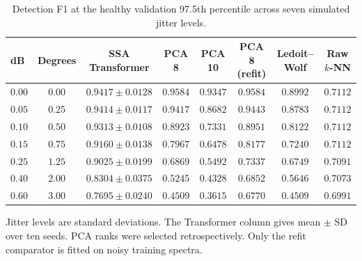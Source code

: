 \begin{table}[!ht]
\centering
\caption{Detection F1 at the healthy validation 97.5th percentile across seven simulated jitter levels.}
\label{tab:fra_noise_sweep}
\footnotesize
\setlength{\tabcolsep}{5pt}
\renewcommand{\arraystretch}{1.17}
\begin{tabular*}{\textwidth}{@{\extracolsep{\fill}}lccccccc@{}}
\toprule
dB & Degrees & SSA Transformer & PCA 8 & PCA 10 & PCA 8 (refit) & Ledoit--Wolf & Raw $k$-NN \\
\midrule
$0.00$ & $0.00$ & $0.9417 \pm 0.0128$ & $0.9584$ & $0.9347$ & $0.9584$ & $0.8992$ & $0.7112$ \\
$0.05$ & $0.25$ & $0.9414 \pm 0.0117$ & $0.9417$ & $0.8682$ & $0.9443$ & $0.8783$ & $0.7112$ \\
$0.10$ & $0.50$ & $0.9313 \pm 0.0108$ & $0.8923$ & $0.7331$ & $0.8951$ & $0.8122$ & $0.7112$ \\
$0.15$ & $0.75$ & $0.9160 \pm 0.0138$ & $0.7967$ & $0.6478$ & $0.8177$ & $0.7240$ & $0.7112$ \\
$0.25$ & $1.25$ & $0.9025 \pm 0.0199$ & $0.6869$ & $0.5492$ & $0.7337$ & $0.6749$ & $0.7091$ \\
$0.40$ & $2.00$ & $0.8304 \pm 0.0375$ & $0.5245$ & $0.4328$ & $0.6852$ & $0.5646$ & $0.7073$ \\
$0.60$ & $3.00$ & $0.7695 \pm 0.0240$ & $0.4509$ & $0.3615$ & $0.6770$ & $0.4509$ & $0.6991$ \\
\bottomrule
\end{tabular*}
\par\smallskip\parbox{\textwidth}{Jitter levels are standard deviations. The Transformer column gives mean $\pm$ SD over ten seeds. PCA ranks were selected retrospectively. Only the refit comparator is fitted on noisy training spectra.}
\end{table}
